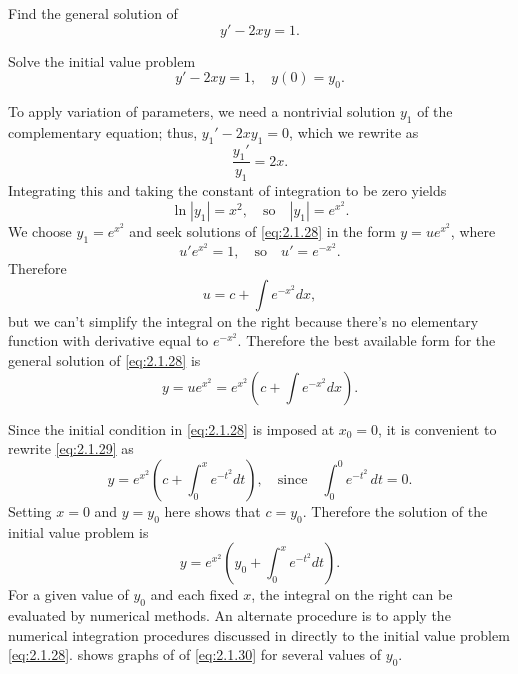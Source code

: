 \begin{example}\label{example:2.1.7}
\begin{alist}
\item %
Find the general solution of
\[
y'-2xy=1.
\]
\item %
Solve the initial value problem
\begin{equation}\label{eq:2.1.28}
y'-2xy=1,\quad y(0)=y_0.
\end{equation}
\end{alist}
\end{example}

\begin{alistSolution}
\item
To apply variation of parameters, we need a nontrivial solution $y_1$
of  the complementary equation;   thus,
$y_1'-2xy_1=0$, which we rewrite as
\[
\frac{y_1'}{y_1}=2x.
\]
Integrating this and taking the constant of integration to be
zero yields
\[
\ln|y_1|=x^2,\quad\text{so}\quad |y_1|=e^{x^2}.
\]
We choose $y_1=e^{x^2}$ and seek solutions of
 \eqref{eq:2.1.28} in the form $y=ue^{x^2}$, where
\[
u'e^{x^2}=1,\quad\text{so}\quad u'=e^{-x^2}.
\]
Therefore
\[
u=c+\int e^{-x^2}dx,
\]
 but we can't simplify the integral on the right because
there's  no elementary function with  derivative equal to $e^{-x^2}$.
Therefore the best available form for the  general solution of
\eqref{eq:2.1.28} is
\begin{equation}\label{eq:2.1.29} y=ue^{x^2}= e^{x^2}\left(c+\int
e^{-x^2}dx\right). \end{equation}

\item
  Since the initial condition in \eqref{eq:2.1.28}
is imposed at $x_0=0$, it is convenient to rewrite \eqref{eq:2.1.29} as
\[
y=e^{x^2}\left(c+\int^x_0 e^{-t^2} dt\right),\quad\text{since}\quad
\int_0^0e^{-t^2}\,dt=0.
\]
 Setting $x=0$ and $y=y_0$ here shows that
$c=y_0$.  Therefore the solution of the initial value problem is
\begin{equation}\label{eq:2.1.30}
y=e^{x^2}\left(y_0 +\int^x_0 e^{-t^2}dt\right).
\end{equation}
For a given value of $y_0$ and each fixed $x$, the integral on the
right can be evaluated by numerical methods. An alternate procedure is
to apply the numerical integration procedures discussed in
 directly to the initial value problem
\eqref{eq:2.1.28}.
 shows graphs of
 of \eqref{eq:2.1.30} for several values of $y_0$.
\end{alistSolution}


